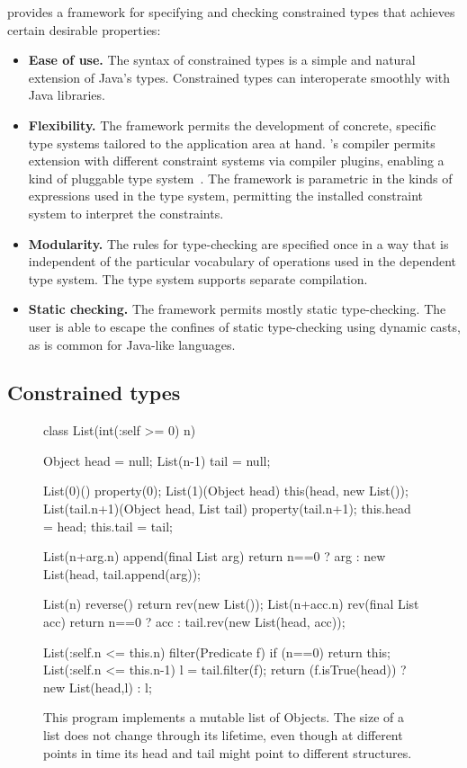 \Xten{} provides a framework for specifying and checking constrained types
that achieves certain desirable properties:
\begin{itemize}
\item 
{\bf Ease of use.}  
The syntax of constrained types is a simple and
natural extension of Java's types.  Constrained types can
interoperate smoothly with Java libraries.

\item
{\bf Flexibility.}
The framework
permits the development of concrete,
specific type systems tailored to the application area at
hand.  \Xten{}'s compiler permits extension with different constraint systems
via compiler plugins, enabling a kind of pluggable type system~\cite{bracha04-pluggable}.
The framework is parametric in the kinds of
expressions used in the type system, permitting the installed constraint
system to interpret the constraints.

\item
{\bf Modularity.}
The rules for type-checking
are specified once in a way that is independent of the
particular vocabulary of operations used in the dependent type
system.
The type system supports separate compilation.

\item
{\bf Static checking.}  The framework permits mostly static
type-checking. The user is able to escape the confines of
static type-checking using dynamic casts, as is common for Java-like
languages.
\end{itemize}

\subsection{Constrained types}

\begin{figure}[t]
\begin{xtenx}
class List(int(:self >= 0) n) {
  Object head = null;
  List(n-1) tail = null;

  List(0)() { property(0); }
  List(1)(Object head) { this(head, new List());}
  List(tail.n+1)(Object head, List tail) {
    property(tail.n+1);
    this.head = head;
    this.tail = tail;
  }

  List(n+arg.n) append(final List arg) {
    return n==0
      ? arg : new List(head, tail.append(arg));
  }

  List(n) reverse() { return rev(new List()); }
  List(n+acc.n) rev(final List acc) {
    return n==0
      ? acc : tail.rev(new List(head, acc));
  }

  List(:self.n <= this.n) filter(Predicate f) {
    if (n==0) return this;
    List(:self.n <= this.n-1) l = tail.filter(f);
    return (f.isTrue(head)) ? new List(head,l) : l;
  }
}
\end{xtenx}
\caption{
This program implements a mutable list of Objects. The size of a list
does not change through its lifetime, even though at different points
in time its head and tail might point to different structures.}
\label{fig:list-example}
\end{figure}

